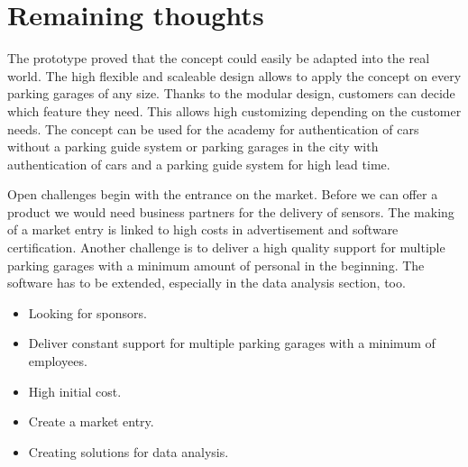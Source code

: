 \chapter{Remaining thoughts}
The prototype proved that the concept could easily be adapted into the real world. The high flexible and scaleable design allows to apply the concept on every parking garages of any size.
Thanks to the modular design, customers can decide which feature they need. This allows high customizing depending on the customer needs. 
The concept can be used for the academy for authentication of cars without a parking guide system or parking garages in the city with authentication of cars and a parking guide system for high lead time.
\par
Open challenges begin with the entrance on the market. Before we can offer a product we would need business partners for the delivery of sensors. The making of a market entry is linked to high costs in advertisement and software certification. Another challenge is to deliver a high quality support for multiple parking garages with a minimum amount of personal in the beginning. The software has to be extended, especially in the data analysis section, too.


\begin{itemize}
    \item Looking for sponsors.
    \item Deliver constant support for multiple parking garages with a minimum of employees.
    \item High initial cost.
    \item Create a market entry.
    \item Creating solutions for data analysis.
\end{itemize}
